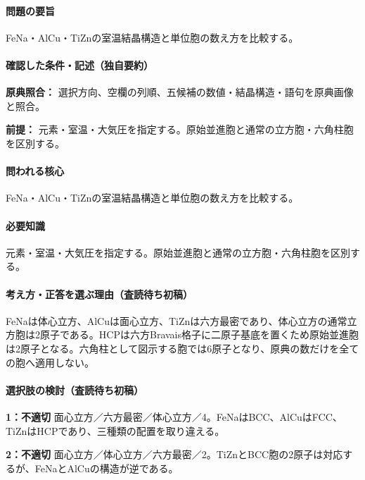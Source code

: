 \paragraph{問題の要旨} FeNa・AlCu・TiZnの室温結晶構造と単位胞の数え方を比較する。

\paragraph{確認した条件・記述（独自要約）}\mbox{}\par

\noindent\textbf{原典照合：} 選択方向、空欄の列順、五候補の数値・結晶構造・語句を原典画像と照合。\par

\noindent\textbf{前提：} 元素・室温・大気圧を指定する。原始並進胞と通常の立方胞・六角柱胞を区別する。\par

\paragraph{問われる核心} FeNa・AlCu・TiZnの室温結晶構造と単位胞の数え方を比較する。

\paragraph{必要知識} 元素・室温・大気圧を指定する。原始並進胞と通常の立方胞・六角柱胞を区別する。

\paragraph{考え方・正答を選ぶ理由（査読待ち初稿）} FeNaは体心立方、AlCuは面心立方、TiZnは六方最密であり、体心立方の通常立方胞は2原子である。HCPは六方Bravais格子に二原子基底を置くため原始並進胞は2原子となる。六角柱として図示する胞では6原子となり、原典の数だけを全ての胞へ適用しない。

\paragraph{選択肢の検討（査読待ち初稿）}\mbox{}\par

\noindent\textbf{1：不適切} 面心立方／六方最密／体心立方／4。FeNaはBCC、AlCuはFCC、TiZnはHCPであり、三種類の配置を取り違える。\par

\noindent\textbf{2：不適切} 面心立方／体心立方／六方最密／2。TiZnとBCC胞の2原子は対応するが、FeNaとAlCuの構造が逆である。\par

